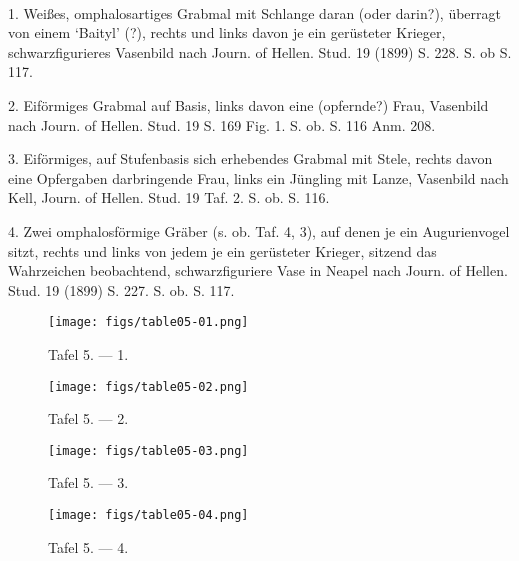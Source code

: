 \documentclass[a4paper, 11pt, oneside]{article}
\begin{document}
\paragraph{}
1. Weißes, omphalosartiges Grabmal mit Schlange daran (oder darin?), überragt von einem `Baityl' (?), rechts und links davon je ein gerüsteter Krieger, schwarzfigurieres Vasenbild nach Journ. of Hellen. Stud. 19 (1899) S. 228. S. ob S. 117.

2. Eiförmiges Grabmal auf Basis, links davon eine (opfernde?) Frau, Vasenbild nach Journ. of Hellen. Stud. 19 S. 169 Fig. 1. S. ob. S. 116 Anm. 208.

3. Eiförmiges, auf Stufenbasis sich erhebendes Grabmal mit Stele, rechts davon eine Opfergaben darbringende Frau, links ein Jüngling mit Lanze, Vasenbild nach Kell, Journ. of Hellen. Stud. 19 Taf. 2. S. ob. S. 116.

4. Zwei omphalosförmige Gräber (s. ob. Taf. 4, 3), auf denen je ein Augurienvogel sitzt, rechts und links von jedem je ein gerüsteter Krieger, sitzend das Wahrzeichen beobachtend, schwarzfiguriere Vase in Neapel nach Journ. of Hellen. Stud. 19 (1899) S. 227. S. ob. S. 117.
\clearpage
\begin{landscape}
\vspace*{\fill}
\begin{figure}[H]
\centering
\texttt{[image: figs/table05-01.png]}
\caption{Tafel 5. --- 1.}
\end{figure}
\vspace*{\fill}
\end{landscape}
\clearpage
\vspace*{\fill}
\begin{figure}[H]
\centering
\texttt{[image: figs/table05-02.png]}
\caption{Tafel 5. --- 2.}
\end{figure}
\vspace*{\fill}
\clearpage
\begin{landscape}
\vspace*{\fill}
\begin{figure}[H]
\centering
\texttt{[image: figs/table05-03.png]}
\caption{Tafel 5. --- 3.}
\end{figure}
\vspace*{\fill}
\clearpage
\vspace*{\fill}
\begin{figure}[H]
\centering
\texttt{[image: figs/table05-04.png]}
\caption{Tafel 5. --- 4.}
\end{figure}
\vspace*{\fill}
\end{landscape}
\clearpage
\end{document}
